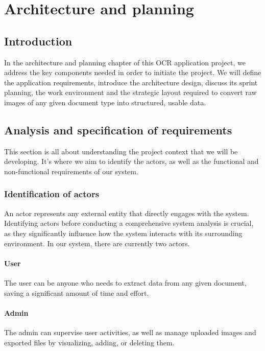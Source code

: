 
\chapter{Architecture and planning}
\label{ch::chapter3}

\section{Introduction}
In the architecture and planning chapter of this OCR application project, we address the key components needed in order to initiate the project. We will define the application requirements, introduce the architecture design, discuss its sprint planning, the work environment and the strategic layout required to convert raw images of any given document type into structured, usable data. \\ 

\section{Analysis and specification of requirements}
This section is all about understanding the project context that we will be developing. It's where  we aim to identify the actors, as well as the functional and non-functional requirements of our system.

\subsection{Identification of actors}
An actor represents any external entity that directly engages with the system. Identifying actors before conducting a comprehensive system analysis is crucial, as they significantly influence how the system interacts with its surrounding environment. In our system, there are currently two actors.

\subsubsection{User} The user can be anyone who needs to extract data from any given document, saving a significant amount of time and effort.
\subsubsection{Admin}
The admin can supervise user activities, as well as manage uploaded images and exported files by visualizing, adding, or deleting them.
 
